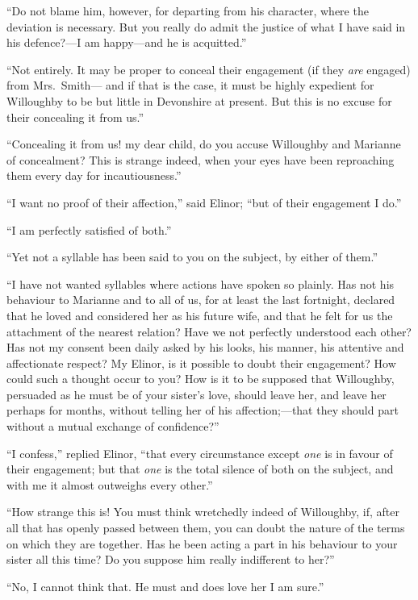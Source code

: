 ``Do not blame him, however, for departing from
his character, where the deviation is necessary.
But you really do admit the justice of what I have said
in his defence?---I am happy---and he is acquitted.''

``Not entirely.  It may be proper to conceal their
engagement (if they \emph{are} engaged) from Mrs.\ Smith---%
and if that is the case, it must be highly expedient
for Willoughby to be but little in Devonshire at present.
But this is no excuse for their concealing it from us.''

``Concealing it from us! my dear child, do you accuse
Willoughby and Marianne of concealment? This is strange
indeed, when your eyes have been reproaching them every day
for incautiousness.''

``I want no proof of their affection,'' said Elinor;
``but of their engagement I do.''

``I am perfectly satisfied of both.''

``Yet not a syllable has been said to you on the
subject, by either of them.''

``I have not wanted syllables where actions have
spoken so plainly.  Has not his behaviour to Marianne
and to all of us, for at least the last fortnight,
declared that he loved and considered her as his future wife,
and that he felt for us the attachment of the nearest
relation?  Have we not perfectly understood each other?
Has not my consent been daily asked by his looks, his manner,
his attentive and affectionate respect?  My Elinor,
is it possible to doubt their engagement?  How could
such a thought occur to you?  How is it to be supposed
that Willoughby, persuaded as he must be of your
sister's love, should leave her, and leave her perhaps
for months, without telling her of his affection;---that
they should part without a mutual exchange of confidence?''

``I confess,'' replied Elinor, ``that every circumstance
except \emph{one} is in favour of their engagement;
but that \emph{one} is the total silence of both on the subject,
and with me it almost outweighs every other.''

``How strange this is!  You must think wretchedly indeed
of Willoughby, if, after all that has openly passed between them,
you can doubt the nature of the terms on which they are together.
Has he been acting a part in his behaviour to your sister
all this time?  Do you suppose him really indifferent to her?''

``No, I cannot think that.  He must and does love her
I am sure.''

